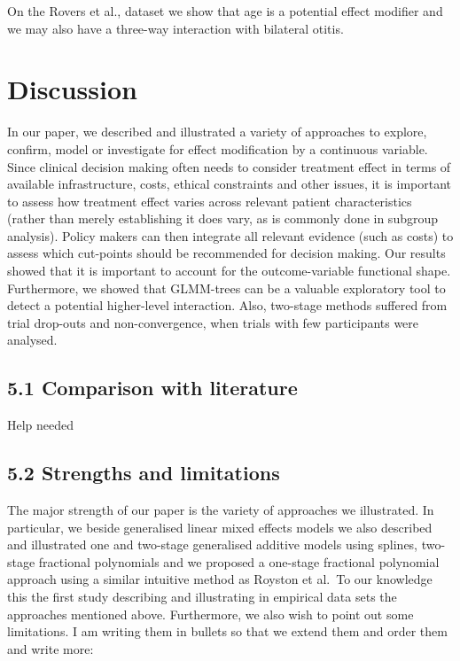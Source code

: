 \documentclass[14pt,]{article}
\let\oldsubparagraph\subparagraph
\renewcommand{\subparagraph}[1]{\oldsubparagraph{#1}\mbox{}}
\begin{document}
On the Rovers et al., dataset we show that age is a potential effect
modifier and we may also have a three-way interaction with bilateral
otitis.

\newpage

\hypertarget{section-2}{%
\subparagraph{}\label{section-2}}

\hypertarget{discussion}{%
\section{Discussion}\label{discussion}}

In our paper, we described and illustrated a variety of approaches to
explore, confirm, model or investigate for effect modification by a
continuous variable. Since clinical decision making often needs to
consider treatment effect in terms of available infrastructure, costs,
ethical constraints and other issues, it is important to assess how
treatment effect varies across relevant patient characteristics (rather
than merely establishing it does vary, as is commonly done in subgroup
analysis). Policy makers can then integrate all relevant evidence (such
as costs) to assess which cut-points should be recommended for decision
making. Our results showed that it is important to account for the
outcome-variable functional shape. Furthermore, we showed that
GLMM-trees can be a valuable exploratory tool to detect a potential
higher-level interaction. Also, two-stage methods suffered from trial
drop-outs and non-convergence, when trials with few participants were
analysed.

\hypertarget{comparison-with-literature}{%
\subsection{5.1 Comparison with
literature}\label{comparison-with-literature}}

Help needed

\hypertarget{strengths-and-limitations}{%
\subsection{5.2 Strengths and
limitations}\label{strengths-and-limitations}}

The major strength of our paper is the variety of approaches we
illustrated. In particular, we beside generalised linear mixed effects
models we also described and illustrated one and two-stage generalised
additive models using splines, two-stage fractional polynomials and we
proposed a one-stage fractional polynomial approach using a similar
intuitive method as Royston et al.~To our knowledge this the first study
describing and illustrating in empirical data sets the approaches
mentioned above. Furthermore, we also wish to point out some
limitations. I am writing them in bullets so that we extend them and
order them and write more:
\end{document}
